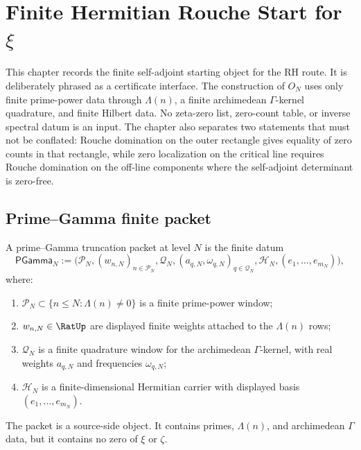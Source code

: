 \chapter{Finite Hermitian Rouche Start for \texorpdfstring{$\xi$}{xi}}
\label{ch:visions-rh-finite-hermitian-rouche-start}

This chapter records the finite self-adjoint starting object for the RH route.
It is deliberately phrased as a certificate interface.  The construction of
$O_N$ uses only finite prime-power data through $\Lambda(n)$, a finite
archimedean $\Gamma$-kernel quadrature, and finite Hilbert data.  No zeta-zero
list, zero-count table, or inverse spectral datum is an input.  The chapter
also separates two statements that must not be conflated: Rouche domination on
the outer rectangle gives equality of zero counts in that rectangle, while
zero localization on the critical line requires Rouche domination on the
off-line components where the self-adjoint determinant is zero-free.

\section{Prime--Gamma finite packet}
\label{sec:rh-prime-gamma-finite-packet}

\begin{definition}
\label{def:rh-prime-gamma-truncation-packet}
A prime--Gamma truncation packet at level $N$ is the finite datum
$$
\mathsf{PGamma}_{N}
:=
\bigl(
\mathcal P_N,
(w_{n,N})_{n\in\mathcal P_N},
\mathcal Q_N,
(a_{q,N},\omega_{q,N})_{q\in\mathcal Q_N},
\mathcal H_N,
(e_1,\ldots,e_{m_N})
\bigr),
$$
where:
\begin{enumerate}
\item $\mathcal P_N\subset\{n\le N:\Lambda(n)\ne0\}$ is a finite prime-power
window;
\item $w_{n,N}\in\RatUp$ are displayed finite weights attached to the
$\Lambda(n)$ rows;
\item $\mathcal Q_N$ is a finite quadrature window for the archimedean
$\Gamma$-kernel, with real weights $a_{q,N}$ and frequencies $\omega_{q,N}$;
\item $\mathcal H_N$ is a finite-dimensional Hermitian carrier with displayed
basis $(e_1,\ldots,e_{m_N})$.
\end{enumerate}
The packet is a source-side object.  It contains primes, $\Lambda(n)$, and
archimedean $\Gamma$ data, but it contains no zero of $\xi$ or $\zeta$.
\end{definition}


